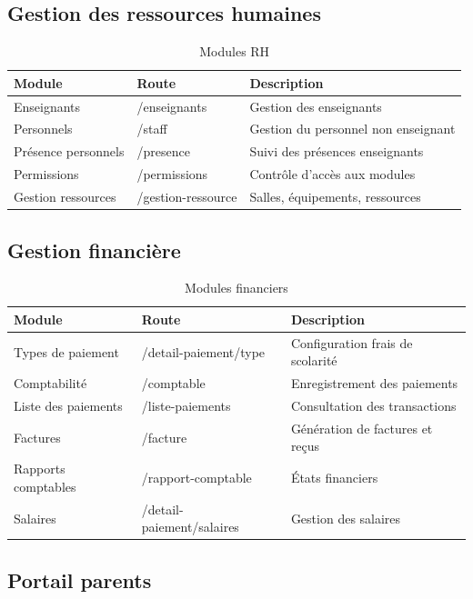 \documentclass[12pt,a4paper,twoside]{report}
\begin{document}
\subsection{Gestion des ressources humaines}

\begin{table}[h]
\centering
\caption{Modules RH}
\begin{tabular}{lll}
\toprule
Module & Route & Description \\
\midrule
Enseignants & /enseignants & Gestion des enseignants \\
Personnels & /staff & Gestion du personnel non enseignant \\
Présence personnels & /presence & Suivi des présences enseignants \\
Permissions & /permissions & Contrôle d'accès aux modules \\
Gestion ressources & /gestion-ressource & Salles, équipements, ressources \\
\bottomrule
\end{tabular}
\end{table}

\subsection{Gestion financière}

\begin{table}[h]
\centering
\caption{Modules financiers}
\begin{tabular}{lll}
\toprule
Module & Route & Description \\
\midrule
Types de paiement & /detail-paiement/type & Configuration frais de scolarité \\
Comptabilité & /comptable & Enregistrement des paiements \\
Liste des paiements & /liste-paiements & Consultation des transactions \\
Factures & /facture & Génération de factures et reçus \\
Rapports comptables & /rapport-comptable & États financiers \\
Salaires & /detail-paiement/salaires & Gestion des salaires \\
\bottomrule
\end{tabular}
\end{table}

\subsection{Portail parents}
\end{document}
